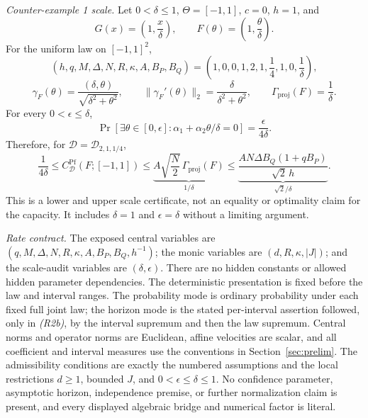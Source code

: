 \begin{theorem}
\emph{Counter-example 1 scale.}
Let $0<\delta\leq1$, $\Theta=[-1,1]$, $c=0$, $h=1$, and
\[
G(x)=\left(1,\frac{x}{\delta}\right),
\qquad
F(\theta)=\left(1,\frac{\theta}{\delta}\right).
\]
For the uniform law on $[-1,1]^2$,
\[
(h,q,M,\Delta,N,R,\kappa,A,B_P,B_Q)
=\left(1,0,0,1,2,1,\frac14,1,0,\frac1\delta\right),
\]
\[
\gamma_F(\theta)
=\frac{(\delta,\theta)}{\sqrt{\delta^2+\theta^2}},
\qquad
\|\gamma_F'(\theta)\|_2
=\frac{\delta}{\delta^2+\theta^2},
\qquad
\Gamma_{\mathrm{proj}}(F)=\frac1\delta.
\]
For every $0<\epsilon\leq\delta$,
\[
\Pr[\exists\theta\in[0,\epsilon]:
 \alpha_1+\alpha_2\theta/\delta=0]
=\frac{\epsilon}{4\delta}.
\]
Therefore, for $\mathcal D=\mathcal D_{2,1,1/4}$,
\[
\frac1{4\delta}
\leq C^{\mathrm{Pf}}_{\mathcal D}(F;[-1,1])
\leq\underbrace{A\sqrt{\frac N2}\,\Gamma_{\mathrm{proj}}(F)}_{1/\delta}
\leq\underbrace{\frac{AN\Delta B_Q(1+qB_P)}{\sqrt2\,h}}_{\sqrt2/\delta}.
\tag{R5}
\]
This is a lower and upper scale certificate, not an equality or optimality
claim for the capacity.  It includes $\delta=1$ and $\epsilon=\delta$
without a limiting argument.

\emph{Rate contract.}
The exposed central variables are
$(q,M,\Delta,N,R,\kappa,A,B_P,B_Q,h^{-1})$; the monic variables are
$(d,R,\kappa,|J|)$; and the scale-audit variables are $(\delta,\epsilon)$.
There are no hidden constants or allowed hidden parameter dependencies.  The
deterministic presentation is fixed before the law and interval ranges.  The
probability mode is ordinary probability under each fixed full joint law; the
horizon mode is the stated per-interval assertion followed, only in
\emph{(R2b)}, by the interval supremum and then the law supremum.  Central
norms and operator norms are Euclidean, affine velocities are scalar, and all
coefficient and interval measures use the conventions in
Section~\ref{sec:prelim}.  The
admissibility conditions are exactly the numbered assumptions and the local
restrictions $d\geq1$, bounded $J$, and
$0<\epsilon\leq\delta\leq1$.  No confidence parameter, asymptotic horizon,
independence premise, or further normalization claim is present, and every
displayed algebraic bridge and numerical factor is literal.
\end{theorem}
